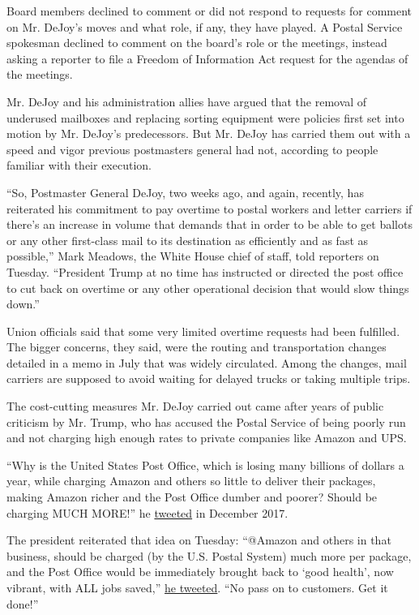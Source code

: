 Board members declined to comment or did not respond to requests for
comment on Mr. DeJoy's moves and what role, if any, they have played. A
Postal Service spokesman declined to comment on the board's role or the
meetings, instead asking a reporter to file a Freedom of Information Act
request for the agendas of the meetings.

Mr. DeJoy and his administration allies have argued that the removal of
underused mailboxes and replacing sorting equipment were policies first
set into motion by Mr. DeJoy's predecessors. But Mr. DeJoy has carried
them out with a speed and vigor previous postmasters general had not,
according to people familiar with their execution.

``So, Postmaster General DeJoy, two weeks ago, and again, recently, has
reiterated his commitment to pay overtime to postal workers and letter
carriers if there's an increase in volume that demands that in order to
be able to get ballots or any other first-class mail to its destination
as efficiently and as fast as possible,'' Mark Meadows, the White House
chief of staff, told reporters on Tuesday. ``President Trump at no time
has instructed or directed the post office to cut back on overtime or
any other operational decision that would slow things down.''

Union officials said that some very limited overtime requests had been
fulfilled. The bigger concerns, they said, were the routing and
transportation changes detailed in a memo in July that was widely
circulated. Among the changes, mail carriers are supposed to avoid
waiting for delayed trucks or taking multiple trips.

The cost-cutting measures Mr. DeJoy carried out came after years of
public criticism by Mr. Trump, who has accused the Postal Service of
being poorly run and not charging high enough rates to private companies
like Amazon and UPS.

``Why is the United States Post Office, which is losing many billions of
dollars a year, while charging Amazon and others so little to deliver
their packages, making Amazon richer and the Post Office dumber and
poorer? Should be charging MUCH MORE!'' he
\href{https://twitter.com/realdonaldtrump/status/946728546633953285}{tweeted}
in December 2017.

The president reiterated that idea on Tuesday: ``@Amazon and others in
that business, should be charged (by the U.S. Postal System) much more
per package, and the Post Office would be immediately brought back to
`good health', now vibrant, with ALL jobs saved,''
\href{https://twitter.com/realDonaldTrump/status/1295855291523723264}{he
tweeted}. ``No pass on to customers. Get it done!''

